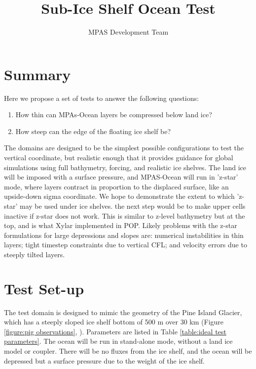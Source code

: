 \documentclass[11pt]{report}
\begin{document}
\title{
Sub-Ice Shelf Ocean Test
}
\author{MPAS Development Team}

\maketitle
\tableofcontents


\chapter{Summary}

Here we propose a set of tests to answer the following questions:
\begin{enumerate}
\item How thin can MPAs-Ocean layers be compressed below land ice?
\item How steep can the edge of the floating ice shelf be?
\end{enumerate}
The domains are designed to be the simplest possible configurations to test the vertical coordinate, but realistic enough that it provides guidance for global simulations using full bathymetry, forcing, and realistic ice shelves.    The land ice will be imposed with a surface pressure, and MPAS-Ocean will run in 'z-star' mode, where layers contract in proportion to the displaced surface, like an upside-down sigma coordinate.  We hope to demonstrate the extent to which 'z-star' may be used under ice shelves.  the next step would be to make upper cells inactive if z-star does not work.  This is similar to z-level bathymetry but at the top, and is what Xylar implemented in POP.  Likely problems with the z-star formulations for large depressions and slopes are: numerical instabilities in thin layers; tight timestep constraints due to vertical CFL; and velocity errors due to steeply tilted layers.


\chapter{Test Set-up}

The test domain is designed to mimic the geometry of the Pine Island Glacier, which has a steeply sloped ice shelf bottom of 500 m over 30 km (Figure \ref{figure:pig observations}, \citet{Jenkins_ea10ngeo}).  Parameters are listed in Table \ref{table:ideal test parameters}.  The ocean will be run in stand-alone mode, without a land ice model or coupler.  There will be no fluxes from the ice shelf, and the ocean will be depressed but a surface pressure due to the weight of the ice shelf.
\end{document}
